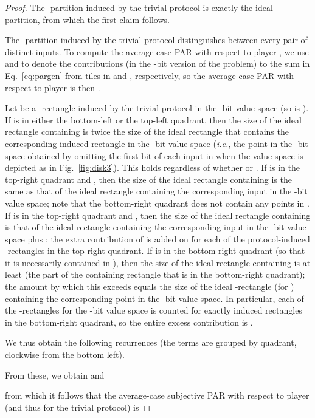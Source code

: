 \documentclass{article}
\theoremstyle{theorem}
\theoremstyle{definition}
\theoremstyle{remark}
\newcommand{\ie}{\emph{i.e.}}
\begin{document}
\begin{proof}
The -partition induced by the trivial protocol is exactly the ideal -partition, from which the first claim follows.

The -partition induced by the trivial protocol distinguishes between every pair of distinct inputs.  To compute the average-case PAR with respect to player , we use  and  to denote the contributions (in the -bit version of the problem) to the sum in Eq.~\ref{eq:pargen} from tiles in  and , respectively, so the average-case PAR with respect to player  is then .

Let  be a -rectangle induced by the trivial protocol in the -bit value space (so  is ).  If  is in either the bottom-left or the top-left quadrant, then the size of the ideal rectangle containing  is twice the size of the ideal rectangle that contains the corresponding induced rectangle in the -bit value space (\ie, the point in the -bit space obtained by omitting the first bit of each input in  when the value space is depicted as in Fig.~\ref{fig:disk3}).  This holds regardless of whether  or .  If  is in the top-right quadrant and , then the size of the ideal rectangle containing  is the same as that of the ideal rectangle containing the corresponding input in the -bit value space; note that the bottom-right quadrant does not contain any points in .  If  is in the top-right quadrant and , then the size of the ideal rectangle containing  is that of the ideal rectangle containing the corresponding input in the -bit value space plus ; the extra contribution of  is added on for each of the  protocol-induced -rectangles in the top-right quadrant.  If  is in the bottom-right quadrant (so that it is necessarily contained in ), then the size of the ideal rectangle containing  is at least  (the part of the containing rectangle that is in the bottom-right quadrant); the amount by which this exceeds  equals the size of the ideal -rectangle (for ) containing the corresponding point in the -bit value space.  In particular, each of the -rectangles for the -bit value space is counted for exactly  induced rectangles in the bottom-right quadrant, so the entire excess contribution is .

We thus obtain the following recurrences (the terms are grouped by quadrant, clockwise from the bottom left).

From these, we obtain  and

from which it follows that the average-case subjective PAR with respect to player  (and thus for the trivial protocol) is

\end{proof}
\end{document}
